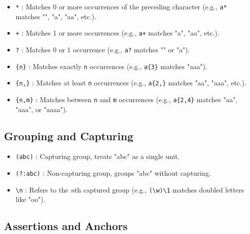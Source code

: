 \begin{itemize}

    \item \texttt{*} : Matches 0 or more occurrences of the preceding character (e.g., \texttt{a*} matches "", "a", "aa", etc.).

    \item \texttt{+} : Matches 1 or more occurrences (e.g., \texttt{a+} matches "a", "aa", etc.).

    \item \texttt{?} : Matches 0 or 1 occurrence (e.g., \texttt{a?} matches "" or "a").

    \item \texttt{\{n\}} : Matches exactly \texttt{n} occurrences (e.g., \texttt{a\{3\}} matches "aaa").

    \item \texttt{\{n,\}} : Matches at least \texttt{n} occurrences (e.g., \texttt{a\{2,\}} matches "aa", "aaa", etc.).

    \item \texttt{\{n,m\}} : Matches between \texttt{n} and \texttt{m} occurrences (e.g., \texttt{a\{2,4\}} matches "aa", "aaa", or "aaaa").

\end{itemize}

\subsection{Grouping and Capturing}

\begin{itemize}

    \item \texttt{(abc)} : Capturing group, treats "abc" as a single unit.

    \item \texttt{(?:abc)} : Non-capturing group, groups "abc" without capturing.

    \item \texttt{\textbackslash n} : Refers to the \emph{n}th captured group (e.g., \texttt{(\textbackslash w)\textbackslash 1} matches doubled letters like "oo").

\end{itemize}

\subsection{Assertions and Anchors}

